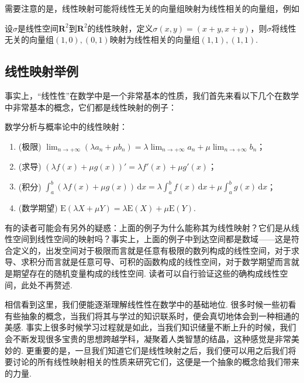 需要注意的是，线性映射可能将线性无关的向量组映射为线性相关的向量组，例如
\begin{example}
    设$\sigma$是线性空间$\mathbf{R}^2$到$\mathbf{R}^2$的线性映射，定义$\sigma(x,y)=(x+y,x+y)$，则$\sigma$将线性无关的向量组$(1,0),(0,1)$映射为线性相关的向量组$(1,1),(1,1)$.
\end{example}

\subsection{线性映射举例}

事实上，``线性性''在数学中是一个非常基本的性质，我们首先来看以下几个在数学中非常基本的概念，它们都是线性映射的例子：
\begin{example}
    数学分析与概率论中的线性映射：
    \begin{enumerate}
        \item (极限) $\displaystyle\lim_{n\to +\infty}(\lambda a_n+\mu b_n)=\lambda\displaystyle\lim_{n\to +\infty}a_n+\mu\displaystyle\lim_{n\to +\infty}b_n$；

        \item (求导) $(\lambda f(x)+\mu g(x))'=\lambda f'(x)+\mu g'(x)$；

        \item (积分) $\displaystyle\int_a^b(\lambda f(x)+\mu g(x))\,\mathrm{d}x=\lambda\displaystyle\int_a^bf(x)\,\mathrm{d}x+\mu\displaystyle\int_a^bg(x)\,\mathrm{d}x$；

        \item (数学期望) $\mathrm{E}(\lambda X+\mu Y)=\lambda \mathrm{E}(X)+\mu \mathrm{E}(Y)$.
    \end{enumerate}
\end{example}

有的读者可能会有另外的疑惑：上面的例子为什么能称其为线性映射？它们是从线性空间到线性空间的映射吗？事实上，上面的例子中到达空间都是数域——这是符合定义的，出发空间对于极限而言就是任意有极限的数列构成的线性空间，对于求导、求积分而言就是任意可导、可积的函数构成的线性空间，对于数学期望而言就是期望存在的随机变量构成的线性空间. 读者可以自行验证这些的确构成线性空间，此处不再赘述.

相信看到这里，我们便能逐渐理解线性性在数学中的基础地位. 很多时候一些初看有些抽象的概念，当我们将其与学过的知识联系时，便会真切地体会到一种相通的美感. 事实上很多时候学习过程就是如此，当我们知识储量不断上升的时候，我们会不断发现很多宝贵的思想跨越学科，凝聚着人类智慧的结晶，这种感觉是非常美妙的. 更重要的是，一旦我们知道它们是线性映射之后，我们便可以用之后我们将要讨论的所有线性映射相关的性质来研究它们，这便是一个抽象的概念给我们带来的力量.

